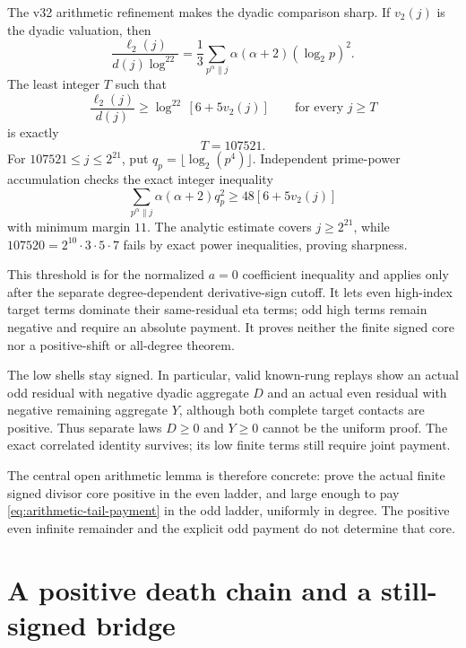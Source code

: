 \documentclass[11pt]{article}
\theoremstyle{definition}
\theoremstyle{remark}
\begin{document}
The v32 arithmetic refinement makes the dyadic comparison sharp. If
$v_2(j)$ is the dyadic valuation, then
\begin{equation}
 \frac{\ell_2(j)}{d(j)\log^22}
 =\frac13\sum_{p^\alpha\parallel j}
   \alpha(\alpha+2)(\log_2p)^2.
 \label{eq:dyadic-prime-powers}
\end{equation}
The least integer $T$ such that
\begin{equation}
 \frac{\ell_2(j)}{d(j)}
 \ge\log^22\,[6+5v_2(j)]
 \qquad\text{for every }j\ge T
 \label{eq:sharp-dyadic-threshold}
\end{equation}
is exactly
\begin{equation}
 T=107521.
\end{equation}
For $107521\le j\le2^{21}$, put
$q_p=\lfloor\log_2(p^4)\rfloor$. Independent prime-power accumulation checks
the exact integer inequality
\begin{equation}
 \sum_{p^\alpha\parallel j}\alpha(\alpha+2)q_p^2
 \ge48[6+5v_2(j)]
\end{equation}
with minimum margin $11$. The analytic estimate covers $j\ge2^{21}$, while
$107520=2^{10}\cdot3\cdot5\cdot7$ fails by exact power inequalities, proving
sharpness.

This threshold is for the normalized $a=0$ coefficient inequality and applies
only after the separate degree-dependent derivative-sign cutoff. It lets even
high-index target terms dominate their same-residual eta terms; odd high terms
remain negative and require an absolute payment. It proves neither the finite
signed core nor a positive-shift or all-degree theorem.

The low shells stay signed. In particular, valid known-rung replays show an
actual odd residual with negative dyadic aggregate $D$ and an actual even
residual with negative remaining aggregate $Y$, although both complete target
contacts are positive. Thus separate laws $D\ge0$ and $Y\ge0$ cannot be the
uniform proof. The exact correlated identity survives; its low finite terms
still require joint payment.

The central open arithmetic lemma is therefore concrete: prove the actual
finite signed divisor core positive in the even ladder, and large enough to pay
\eqref{eq:arithmetic-tail-payment} in the odd ladder, uniformly in degree. The
positive even infinite remainder and the explicit odd payment do not determine
that core.

\section{A positive death chain and a still-signed bridge}
\end{document}
